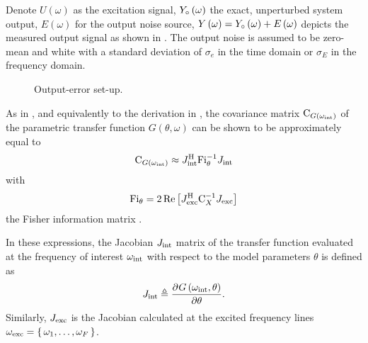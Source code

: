   Denote
    $U  \left(\omega\right)$ as the excitation signal,
    ${Y}_{\circ}\left(\omega\right)$ the exact, unperturbed system output,
    $E  \left(\omega\right)$ for the output noise source,
    $Y  \left(\omega\right) = {Y}_{\circ}\left( \omega \right) + E\left( \omega \right)$ depicts the measured output signal as shown in .
    The output noise is assumed to be zero-mean and white with a standard deviation of $\sigma_e$ in the time domain or $\sigma_E$ in the frequency domain.

  \begin{figure}[h]
    \centering
    
    \caption[Output-error]{Output-error set-up.}
    \label{fig:excitation:OE}
  \end{figure}

  As in \citep{Pintelon2012, Gallager2008, matrixcookbook}, and equivalently to the derivation in , the covariance matrix $\mathrm{C}_{G\left(\omega_{\mathrm{int}}\right)}$ of the parametric transfer function $G(\theta,\omega)$ can be shown to be approximately equal to
  \begin{align}
    \C_{G\left( \omega_{\interest}\right) } \approx
      \InnerQuadraticForm[\HT]
                         {\jac{\interest}}
                         {\FisherInformation_{\theta}^{-1}}
     \label{eq:excitation:varPeak}
  \end{align}
  with 
  \begin{equation}
    \FisherInformation_{\theta} =
    2
    \real{
          \InnerQuadraticForm[\HT]
                              {\jac{\excited}}
                              {\C_{X}^{-1}}
          }
    \label{eq:excitation:FisherInfo}
  \end{equation}
  the Fisher information matrix \citep{Pintelon2012}.

  In these expressions, the Jacobian $J_{\mathrm{int}}$ matrix of the transfer function evaluated at the frequency of interest $\omega_{\mathrm{int}}$ with respect to the model parameters $\theta$ is defined as
  \begin{equation}
    J_{\mathrm{int}} \triangleq
         \frac{{\partial}^{} G\left( \omega_{\mathrm{int}}, \theta \right) }{\partial \theta}
    \text{.}
  \end{equation}
  Similarly, $J_{\mathrm{exc}}$ is the Jacobian calculated at the excited frequency lines $\omega_{\mathrm{exc}} = \set{\omega_1, \ldots, \omega_F}$.

